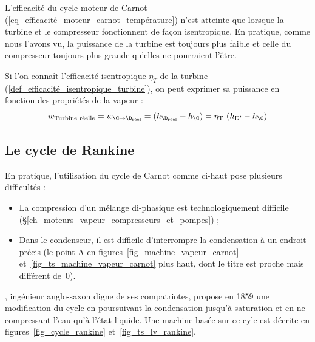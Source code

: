 		L’efficacité du cycle moteur de Carnot (\ref{eq_efficacité_moteur_carnot_température}) n’est atteinte que lorsque la turbine et le compresseur fonctionnent de façon isentropique. En pratique, comme nous l’avons vu, la puissance de la turbine est toujours plus faible et celle du compresseur toujours plus grande qu’elles ne pourraient l’être.
		
		Si l’on connaît l’efficacité isentropique $\eta _T$ de la turbine (\ref{def_efficacité_isentropique_turbine}), on peut exprimer sa puissance en fonction des propriétés de la vapeur :
		\begin{equation}
			w_\text{Turbine~réelle} = w_{\C \to \D_\text{réel}} = (h_{\D_\text{réel}} - h_\C) = \eta_\text{T} \ (h_{\text{D'}} - h_\C)
		\end{equation}

	\subsection{Le cycle de Rankine}
	\label{ch_cycle_de_rankine}

		En pratique, l’utilisation du cycle de Carnot comme ci-haut pose plusieurs difficultés :

		\begin{itemize}
			\item La compression d’un mélange di-phasique est technologiquement difficile (\S\ref{ch_moteurs_vapeur_compresseurs_et_pompes}) ;
			\item Dans le condenseur, il est difficile d’interrompre la condensation à un endroit précis (le point A en figures~\ref{fig_machine_vapeur_carnot} et~\ref{fig_ts_machine_vapeur_carnot} plus haut, dont le titre est proche mais différent de~0).
		\end{itemize}

		, ingénieur anglo-saxon digne de ses compatriotes, propose en 1859 une modification du cycle en poursuivant la condensation jusqu’à saturation et en ne compressant l’eau qu’à l’état liquide. Une machine basée sur ce cyle est décrite en figures~\ref{fig_cycle_rankine} et~\ref{fig_ts_lv_rankine}.

